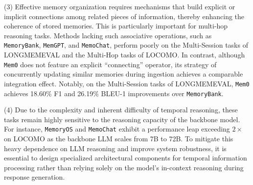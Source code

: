 (3) Effective memory organization requires mechanisms that build explicit or implicit connections among related pieces of information, thereby enhancing the coherence of stored memories. This is particularly important for multi-hop reasoning tasks. Methods lacking such associative operations, such as {\tt MemoryBank}, {\tt MemGPT}, and {\tt MemoChat}, perform poorly on the Multi-Session tasks of LONGMEMEVAL and the Multi-Hop tasks of LOCOMO. In contrast, although {\tt Mem0} does not feature an explicit ``connecting'' operator, its strategy of concurrently updating similar memories during ingestion achieves a comparable integration effect. Notably, on the Multi-Session tasks of LONGMEMEVAL, {\tt Mem0} achieves 18.60\% F1 and 26.19\% BLEU-1 improvements over {\tt MemoryBank}.


(4) Due to the complexity and inherent difficulty of temporal reasoning, these tasks remain highly sensitive to the reasoning capacity of the backbone model. For instance, {\tt MemoryOS} and {\tt MemoChat} exhibit a performance leap exceeding $2\times$ on LOCOMO as the backbone LLM scales from 7B to 72B. To mitigate this heavy dependence on LLM reasoning and improve system robustness, it is essential to design specialized architectural components for temporal information processing rather than relying solely on the model's in-context reasoning during response generation.



